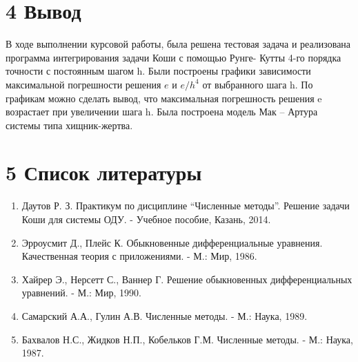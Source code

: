 \documentclass[a4paper,14pt]{extreport}
\begin{document}
\newpage
\section*{4 Вывод}
\par \hspace{0.8cm} В ходе выполнении курсовой работы, была решена тестовая задача и реализована программа интегрирования задачи Коши с 
помощью Рунге- Кутты 4-го порядка точности с постоянным шагом h. Были построены графики зависимости максимальной 
погрешности решения $e$ и $e/h^4$ от выбранного шага h. По графикам можно сделать вывод, что максимальная погрешность
решения e возрастает при увеличении шага h. Была построена модель Мак – Артура системы типа хищник-жертва. 

\newpage
\section*{5 Список литературы}
\begin{enumerate}
  \item Даутов Р. З. Практикум по дисциплине “Численные методы”. Решение задачи Коши для системы ОДУ. - Учебное пособие, Казань, 2014.
  \item Эрроусмит Д., Плейс К. Обыкновенные дифференциальные уравнения. Качественная теория с приложениями. - М.: Мир, 1986.
  \item Хайрер Э., Нерсетт С., Ваннер Г. Решение обыкновенных дифференциальных уравнений. - М.: Мир, 1990.
  \item Самарский А.А., Гулин А.В. Численные методы. - М.: Наука, 1989.
  \item Бахвалов Н.С., Жидков Н.П., Кобельков Г.М. Численные методы. - М.: Наука, 1987.
\end{enumerate}


\newpage
\end{document}
